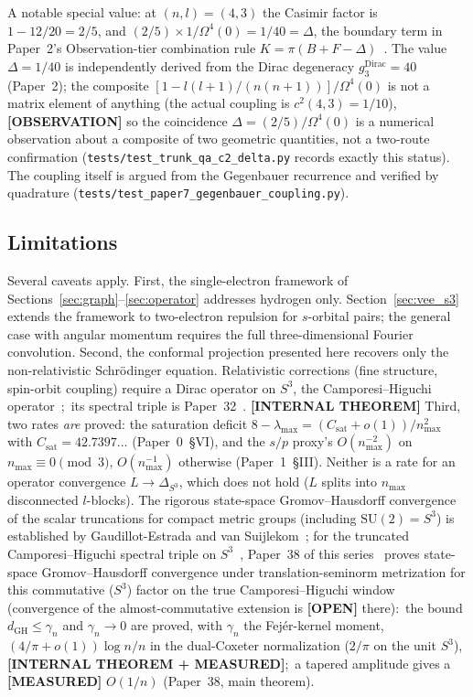 \documentclass[aps,pra,twocolumn,superscriptaddress,longbibliography]{revtex4-2}
\newcommand{\gvq}[2]{#2}
\newcommand{\gvc}[2]{#2}
\begin{document}
A notable special value: at $(n,l) = (4,3)$ the Casimir factor is
$1 - 12/20 = 2/5$, and $(2/5) \times 1/\Omega^4(0) = \gvq{delta_dirac}{1/40} = \Delta$, the
boundary term in \gvc{k-combination-rule}{Paper~2's Observation-tier combination rule
$K = \pi(B + F - \Delta)$}~\cite{loutey_paper2}.  The value $\Delta =
1/40$ is independently derived from the Dirac degeneracy
$g_3^{\mathrm{Dirac}} = 40$ (Paper~2); the composite
$[1 - l(l+1)/(n(n+1))]/\Omega^4(0)$ is not a matrix element of
anything (the actual coupling is $c^2(4,3) = 1/10$),
\textbf{[OBSERVATION]} so the coincidence $\Delta = (2/5)/\Omega^4(0)$
is a numerical observation about a composite of two geometric
quantities, not a two-route confirmation
(\texttt{tests/test\_trunk\_qa\_c2\_delta.py} records exactly this
status).  The coupling itself is argued from the Gegenbauer recurrence
and verified by quadrature
(\texttt{tests/test\_paper7\_gegenbauer\_coupling.py}).

\subsection{Limitations}

Several caveats apply. First, the single-electron framework of Sections~\ref{sec:graph}--\ref{sec:operator} addresses hydrogen only. Section~\ref{sec:vee_s3} extends the framework to two-electron repulsion for $s$-orbital pairs; the general case with angular momentum requires the full three-dimensional Fourier convolution. Second, the conformal projection presented here recovers only the non-relativistic Schr\"odinger equation. Relativistic corrections (fine structure, spin-orbit coupling) require a Dirac operator on $S^3$, the Camporesi--Higuchi operator~\cite{camporesi_higuchi1996};\ its spectral triple is Paper~32~\cite{loutey_paper32}. \textbf{[INTERNAL THEOREM]} Third, two rates \emph{are} proved: the saturation deficit $8 - \lambda_{\max} = (C_{\mathrm{sat}} + o(1))/n_{\max}^2$ with $C_{\mathrm{sat}} = \gvq{saturation_c}{42.7397}\ldots$ (Paper~0~\S VI), and the $s/p$ proxy's $O(n_{\max}^{-2})$ on $n_{\max} \equiv 0 \pmod 3$, $O(n_{\max}^{-1})$ otherwise (Paper~1~\S III). Neither is a rate for an operator convergence $L \to \Delta_{S^3}$, which does not hold ($L$ splits into $n_{\max}$ disconnected $l$-blocks).  The rigorous state-space Gromov--Hausdorff convergence of the scalar truncations for compact metric groups (including $\mathrm{SU}(2) = S^3$) is established by Gaudillot-Estrada and van Suijlekom~\cite{gaudillot_vs2025}; for the truncated Camporesi--Higuchi spectral triple on $S^3$~\cite{camporesi_higuchi1996}, \gvc{wh1-p38-gh-convergence}{Paper~38 of this series~\cite{loutey_paper38} proves state-space Gromov--Hausdorff convergence under translation-seminorm metrization for this commutative ($S^3$) factor on the true Camporesi--Higuchi window (convergence of the almost-commutative extension is \textbf{[OPEN]} there)}:\ the bound $d_{\mathrm{GH}} \le \gamma_n$ and $\gamma_n \to 0$ are proved, \gvc{p38-rate-constant}{with $\gamma_n$ the Fej\'er-kernel moment, $(4/\pi + o(1))\log n/n$ in the dual-Coxeter normalization ($2/\pi$ on the unit $S^3$), \textbf{[INTERNAL THEOREM + MEASURED]}};\ a tapered amplitude gives a \textbf{[MEASURED]} $O(1/n)$ (Paper~38, main theorem).
\end{document}
